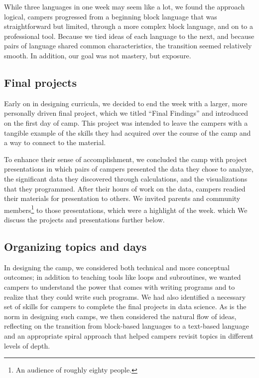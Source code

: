 While three languages in one week may seem like a lot, we found the
approach logical, campers progressed from a beginning block language 
that was straightforward but limited, through a more complex block
language, and on to a professional tool.  Because we tied ideas of
each language to the next, and because pairs of language shared
common characteristics, the transition seemed relatively smooth.  In
addition, our goal was not mastery, but exposure.

\subsection{Final projects}

Early on in designing curricula, we decided to end the week with a
larger, more personally driven final project, which we titled ``Final
Findings'' and introduced on the first day of camp.  This project
was intended to leave the campers with a tangible example of the
skills they had acquired over the course of the camp and a way to
connect to the material.

To enhance their sense of accomplishment, we concluded the camp
with project presentations in which pairs of campers presented the
data they chose to analyze, the significant data they discovered
through calculations, and the visualizations that they programmed.
After their hours of work on the data, campers readied their materials
for presentation to others.  We invited parents and community
members\footnote{An audience of roughly eighty people.} to those
presentations, which were a highlight of the week. which We discuss
the projects and presentations further below.

\subsection{Organizing topics and days}

In designing the camp, we considered both technical and
more conceptual outcomes; in addition to teaching tools
like loops and subroutines, we wanted campers to understand the
power that comes with writing programs and to realize that they
could write such programs.  We had also identified a necessary set
of skills for campers to complete the final projects in data
science.  As is the norm in designing such camps, we then considered
the natural flow of ideas, reflecting on the transition from
block-based languages to a text-based language and an appropriate
spiral approach that helped campers revisit topics in different
levels of depth.

